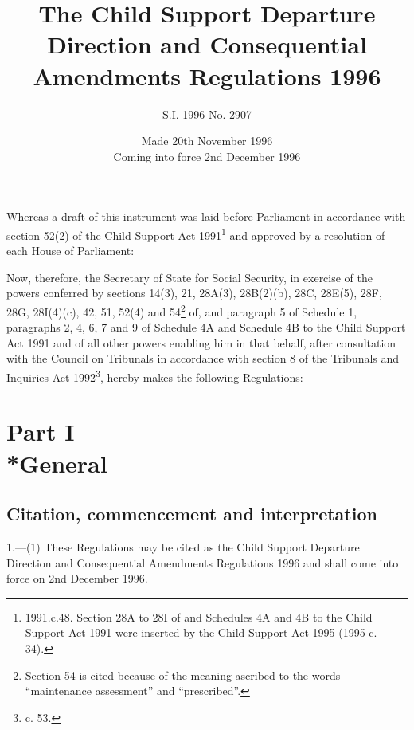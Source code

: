 \documentclass[a4paper]{article}
\title{The Child Support Departure Direction and Consequential Amendments
Regulations 1996}
\author{S.I. 1996 No. 2907}
\date{Made 20th November 1996\\Coming into force 2nd December 1996
}
\newcommand{\parthead}{}
\begin{document}
\maketitle

\noindent
Whereas a draft of this instrument was laid before Parliament in accordance with
section 52(2) of the Child Support Act 1991\footnote{\frenchspacing 1991.c.48.
Section 28A to 28I of and Schedules 4A and 4B to the Child Support Act 1991 were
inserted by the Child Support Act 1995 (1995 c. 34).} and approved by a
resolution of each House of Parliament:

Now, therefore, the Secretary of State for Social Security, in exercise of the
powers conferred by sections 14(3), 21, 28A(3), 28B(2)(b), 28C, 28E(5), 28F,
28G, 28I(4)(c), 42, 51, 52(4) and 54\footnote{\frenchspacing Section 54 is cited
because of the meaning ascribed to the words “maintenance assessment” and
“prescribed”.} of, and paragraph 5 of Schedule 1, paragraphs 2, 4, 6, 7 and 9 of
Schedule 4A and Schedule 4B to the Child Support Act 1991 and of all other
powers enabling him in that behalf, after consultation with the Council on
Tribunals in accordance with section 8 of the Tribunals and Inquiries Act
1992\footnote{ c. 53.}, hereby makes the following
Regulations:

{\sloppy

\tableofcontents

}

\setcounter{secnumdepth}{-2}

\section[Part I --- General]{Part I\\*General}

\subsection[1. Citation, commencement and interpretation]{Citation, commencement and interpretation}

\renewcommand\parthead{--- Part I}

1.—(1) These Regulations
may be cited as the Child Support Departure Direction and Consequential
Amendments Regulations 1996 and shall come into force on 2nd December 1996.
\end{document}
